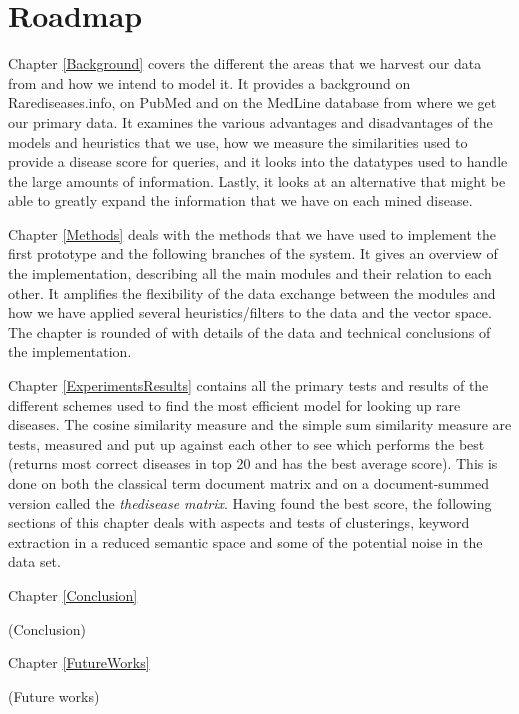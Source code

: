 \section{Roadmap}

Chapter \ref{Background} covers the different the areas that we harvest our
data from and how we intend to model it. It provides a background on
Rarediseases.info, on PubMed and on the MedLine database from where we
get our primary data. It examines the various advantages and
disadvantages of the models and heuristics that we use, how we measure
the similarities used to provide a disease score for queries, and it
looks into the datatypes used to handle the large amounts of
information. Lastly, it looks at an alternative that might be able to
greatly expand the information that we have on each mined disease.

Chapter \ref{Methods} deals with the methods that we have used to implement
the first prototype and the following branches of the system. It gives
an overview of the implementation, describing all the main modules and
their relation to each other. It amplifies the flexibility of the data
exchange between the modules and how we have applied several
heuristics/filters to the data and the vector space. The chapter is
rounded of with details of the data and technical conclusions of the
implementation.

Chapter \ref{ExperimentsResults} contains all the primary tests and results of the different schemes used to find the most efficient model for looking up rare diseases. The cosine similarity measure and the simple sum similarity measure are tests, measured and put up against each other to see which performs the best (returns most correct diseases in top 20 and has the best average score). This is done on both the classical term document matrix and on a document-summed version called the \textit{thedisease matrix}. Having found the best score, the following sections of this chapter deals with aspects and tests of clusterings, keyword extraction in a reduced semantic space and some of the potential noise in the data set.

Chapter \ref{Conclusion}

(Conclusion)

Chapter \ref{FutureWorks}

(Future works) 
